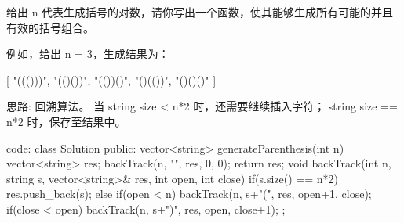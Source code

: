 给出 n 代表生成括号的对数，请你写出一个函数，使其能够生成所有可能的并且有效的括号组合。

例如，给出 n = 3，生成结果为：

[
  "((()))",
  "(()())",
  "(())()",
  "()(())",
  "()()()"
]
























思路:
回溯算法。
当 string size < n*2 时，还需要继续插入字符；
   string size == n*2 时，保存至结果中。























code:
class Solution {
public:
    vector<string> generateParenthesis(int n) {
        vector<string> res;
        backTrack(n, "", res, 0, 0);
        return res;
    }
    void backTrack(int n, string s, vector<string>& res, int open, int close)
    {
        if(s.size() == n*2) res.push_back(s);
        else
        {
            if(open < n) backTrack(n, s+"(", res, open+1, close);
            if(close < open) backTrack(n, s+")", res, open, close+1);
        }
    }
};